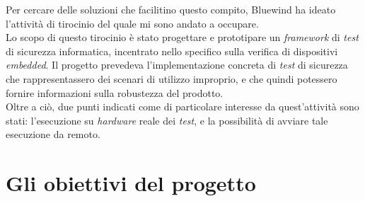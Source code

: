 \noindent
Per cercare delle soluzioni che facilitino questo compito, Bluewind ha ideato l'attività di tirocinio del quale mi sono andato a occupare.\\
Lo scopo di questo tirocinio è stato progettare e prototipare un \textit{framework} di \textit{test} di sicurezza informatica, incentrato nello specifico sulla verifica di dispositivi \textit{embedded}.
Il progetto prevedeva l'implementazione concreta di \textit{test} di sicurezza che rappresentassero dei scenari di utilizzo improprio, e che quindi potessero fornire informazioni sulla robustezza del prodotto.\\
Oltre a ciò, due punti indicati come di particolare interesse da quest'attività sono stati: l'esecuzione su \textit{hardware} reale dei \textit{test}, e la possibilità di avviare tale esecuzione da remoto.




\section{Gli obiettivi del progetto}
